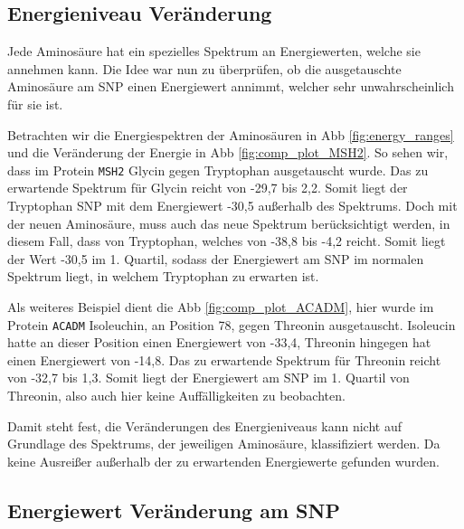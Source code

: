 \subsection{Energieniveau Veränderung}

Jede Aminosäure hat ein spezielles Spektrum an Energiewerten, welche sie annehmen kann. Die Idee war nun zu überprüfen, ob die ausgetauschte Aminosäure am \ac{SNP} einen Energiewert annimmt, welcher sehr unwahrscheinlich für sie ist.

Betrachten wir die Energiespektren der Aminosäuren in \ac{Abb} \ref{fig:energy_ranges} und die Veränderung der Energie in \ac{Abb} \ref{fig:comp_plot_MSH2}. So sehen wir, dass im Protein \texttt{MSH2} Glycin gegen Tryptophan ausgetauscht wurde. Das zu erwartende Spektrum für Glycin reicht von -29,7 bis 2,2. Somit liegt der Tryptophan \ac{SNP} mit dem Energiewert -30,5 außerhalb des Spektrums. Doch mit der neuen Aminosäure, muss auch das neue Spektrum berücksichtigt werden, in diesem Fall, dass von Tryptophan, welches von -38,8 bis -4,2 reicht. Somit liegt der Wert -30,5 im 1. Quartil, sodass der Energiewert am \ac{SNP} im normalen Spektrum liegt, in welchem Tryptophan zu erwarten ist.

Als weiteres Beispiel dient die \ac{Abb} \ref{fig:comp_plot_ACADM}, hier wurde im Protein \texttt{ACADM} Isoleuchin, an Position 78, gegen Threonin ausgetauscht. Isoleucin hatte an dieser Position einen Energiewert von -33,4, Threonin hingegen hat einen Energiewert von -14,8. Das zu erwartende Spektrum für Threonin reicht von -32,7 bis 1,3. Somit liegt der Energiewert am \ac{SNP} im 1. Quartil von Threonin, also auch hier keine Auffälligkeiten zu beobachten.

Damit steht fest, die Veränderungen des Energieniveaus kann nicht auf Grundlage des Spektrums, der jeweiligen Aminosäure, klassifiziert werden. Da keine Ausreißer außerhalb der zu erwartenden Energiewerte gefunden wurden. 


\subsection{Energiewert Veränderung am SNP}

